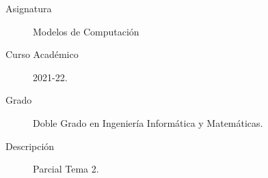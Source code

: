 \documentclass[12pt]{article}
\begin{document}

    
    

    \begin{description}
        \item[Asignatura] Modelos de Computación
        \item[Curso Académico] 2021-22.
        \item[Grado] Doble Grado en Ingeniería Informática y Matemáticas.
        \item[Descripción] Parcial Tema 2.
    \end{description}
    \newpage
    
\end{document}
